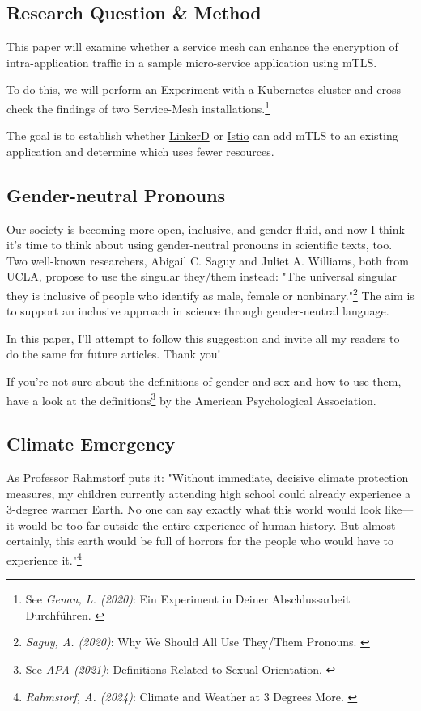 \subsection{Research Question \& Method}

This paper will examine whether a service mesh can enhance the encryption of intra-application traffic in a sample micro-service application using mTLS.

To do this, we will perform an Experiment with a Kubernetes cluster and cross-check the findings of two Service-Mesh installations.\footnote{See \textit{Genau, L. (2020)}: Ein Experiment in Deiner Abschlussarbeit Durchführen. \cite{expScribbr}}

The goal is to establish whether \href{https://linkerd.io/}{LinkerD} or \href{https://istio.io/}{Istio} can add mTLS to an existing application and determine which uses fewer resources.

\subsection{Gender-neutral Pronouns}

Our society is becoming more open, inclusive, and gender-fluid, and now I think it's time to think about using gender-neutral pronouns in scientific texts, too. Two well-known researchers, Abigail C. Saguy and Juliet A. Williams, both from UCLA, propose to use the singular they/them instead: "The universal singular they is inclusive of people who identify as male, female or nonbinary."\footnote{\textit{Saguy, A. (2020)}: Why We Should All Use They/Them Pronouns. \cite{pronouns}} The aim is to support an inclusive approach in science through gender-neutral language. 

In this paper, I'll attempt to follow this suggestion and invite all my readers to do the same for future articles. Thank you!

If you're not sure about the definitions of gender and sex and how to use them, have a look at the definitions\footnote{See \textit{APA (2021)}: Definitions Related to Sexual Orientation. \cite{apaDefinitions}} by the American Psychological Association.

\subsection{Climate Emergency}

As Professor Rahmstorf puts it: "Without immediate, decisive climate protection measures, my children currently attending high school could already experience a 3-degree warmer Earth. No one can say exactly what this world would look like—it would be too far outside the entire experience of human history. But almost certainly, this earth would be full of horrors for the people who would have to experience it."\footnote{\textit{Rahmstorf, A. (2024)}: Climate and Weather at 3 Degrees More. \cite{3dgreesMore}}
